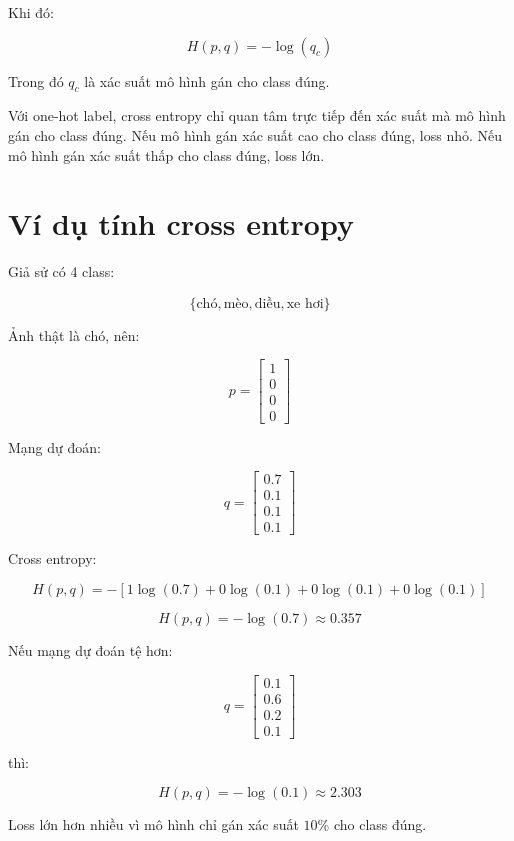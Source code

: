 \documentclass[12pt,a4paper]{report}
\begin{document}
Khi đó:

\[
    H(p,q) = -\log(q_c)
\]

Trong đó $q_c$ là xác suất mô hình gán cho class đúng.

\begin{ghinho}
Với one-hot label, cross entropy chỉ quan tâm trực tiếp đến xác suất mà mô hình gán cho class đúng. Nếu mô hình gán xác suất cao cho class đúng, loss nhỏ. Nếu mô hình gán xác suất thấp cho class đúng, loss lớn.
\end{ghinho}

\section{Ví dụ tính cross entropy}

Giả sử có 4 class:

\[
    \{\text{chó},\text{mèo},\text{diều},\text{xe hơi}\}
\]

Ảnh thật là chó, nên:

\[
    p =
    \begin{bmatrix}
    1\\0\\0\\0
    \end{bmatrix}
\]

Mạng dự đoán:

\[
    q =
    \begin{bmatrix}
    0.7\\
    0.1\\
    0.1\\
    0.1
    \end{bmatrix}
\]

Cross entropy:

\[
    H(p,q) =
    -[1\log(0.7)+0\log(0.1)+0\log(0.1)+0\log(0.1)]
\]

\[
    H(p,q) = -\log(0.7) \approx 0.357
\]

Nếu mạng dự đoán tệ hơn:

\[
    q =
    \begin{bmatrix}
    0.1\\
    0.6\\
    0.2\\
    0.1
    \end{bmatrix}
\]

thì:

\[
    H(p,q)=-\log(0.1)\approx 2.303
\]

Loss lớn hơn nhiều vì mô hình chỉ gán xác suất $10\%$ cho class đúng.
\end{document}
